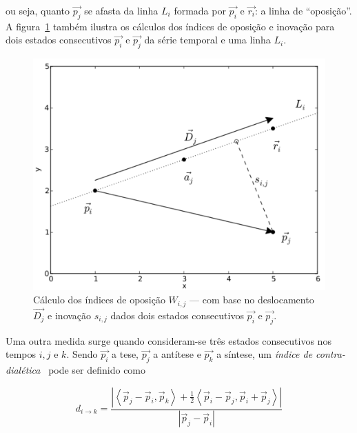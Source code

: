 \noindent ou seja, quanto $\vec{p_j}$ se afasta da linha $L_i$ formada por $\vec{p_i}$ e
$\vec{r_i}$: a linha de ``oposição''.  A
figura~\ref{fig:desc_opos_inov} também ilustra os cálculos dos índices
de oposição e inovação para dois estados consecutivos $\vec{p_i}$ e
$\vec{p_j}$ da série temporal e uma linha $L_i$.

\begin{figure}[ht!]
\begin{center}
              \caption{Cálculo dos índices de oposição $W_{i,j}$ --- com base
        no deslocamento $\vec{D_j}$ e inovação $s_{i,j}$ dados dois
        estados consecutivos $\vec{p_i}$ e $\vec{p_j}$.}
        \label{fig:desc_opos_inov}
        \includegraphics[scale=.6]{figs/desc_opos2.pdf}
        \fonteminha
\end{center}
\end{figure}

Uma outra medida surge quando consideram-se três estados consecutivos
nos tempos $i, j$ e $k$. Sendo $\vec{p_i}$ a tese, $\vec{p_j}$ a
antítese e $\vec{p_k}$ a síntese, um \emph{índice de
  contra-dialética}~\cite{vieira} pode ser definido como


\begin{equation}
d_{i \rightarrow k} = 
      \frac{|\left< \vec{p}_j-\vec{p}_i,\vec{p}_k \right> + 
        \frac{1}{2}\left<\vec{p}_i-\vec{p}_j, \vec{p}_i+\vec{p}_j\right>|}
           {|\vec{p}_j-\vec{p}_i|}
\end{equation}

